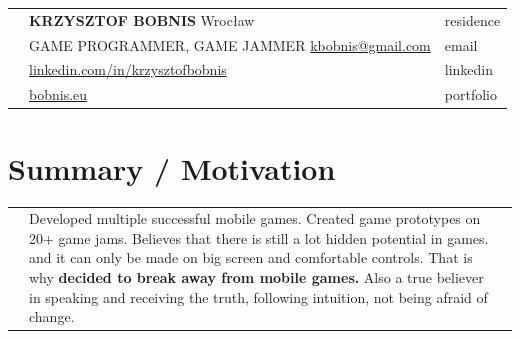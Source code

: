\documentclass[12pt,a4paper]{article}
\begin{document}
\begin{tabular}  { >{\RaggedLeft}p{0cm} p{15.5cm}  p{2cm} }  
	& {\Large \textbf{KRZYSZTOF BOBNIS}} \hfill Wrocław & \textcolor{techColor}{residence} \\
	& GAME PROGRAMMER, GAME JAMMER \hfill  {\href{mailto:kbobnis@gmail.com}{kbobnis@gmail.com}} & \textcolor{techColor}{email} \\ 
	& \hfill {\href{https://www.linkedin.com/in/krzysztofbobnis}{linkedin.com/in/krzysztofbobnis}} & \textcolor{techColor}{linkedin} \\
	& \hfill {\href{http://bobnis.eu}{bobnis.eu}} & \textcolor{techColor}{portfolio} \\
\end{tabular}	 

\vspace{0.0cm}

\centering
\section*{Summary / Motivation}

	\begin{tabular}  { >{\RaggedLeft}p{0cm}  p{17cm}  p{0cm} }  

		 & Developed multiple successful mobile games. Created game prototypes on 20+ game jams. Believes that there is still a lot hidden potential in games.  and it can only be made on big screen and comfortable controls. That is why \textbf{decided to break away from mobile games.} Also a true believer in speaking and receiving the truth, following intuition, not being afraid of change. & \\
	\end{tabular}

\vspace*{1cm}
\end{document}
